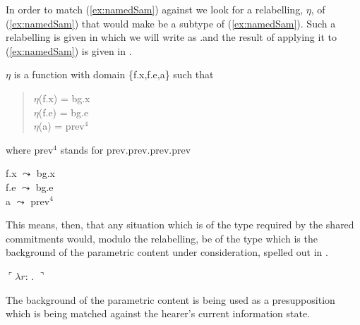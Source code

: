 In order to match (\ref{ex:namedSam})  against \preveg{}  we look
for a relabelling, $\eta$, of (\ref{ex:namedSam}) that would make
\preveg{} be a subtype of (\ref{ex:namedSam}).  Such a
relabelling is given in  which we will write as .and the result of applying it to
(\ref{ex:namedSam}) is given in .
\begin{ex}
\begin{subex}
\item $\eta$ is a function with domain \{f.x,f.e,a\} such that
\begin{quote}
$\eta$(f.x) = bg.x\\
$\eta$(f.e) = bg.e\\
$\eta$(a) = prev$^4$
\end{quote}
where prev$^4$ stands for prev.prev.prev.prev
\item f.x $\leadsto$ bg.x\\
f.e $\leadsto$ bg.e\\
a $\leadsto$ prev$^4$
 
\item 
{}

\end{subex}
\end{ex}
This means, then, that any situation which is of the type required by
the shared commitments would, modulo the relabelling, be of the type
which is the background of the parametric content under consideration,
spelled out in \nexteg{}.
\begin{ex}
$\ulcorner\lambda
  r$: . 
$\urcorner$ 
\label{ex:pcont-samleft} 
\end{ex}
The background of the parametric content is
being used as a presupposition which is being matched against the
hearer's current information state.

